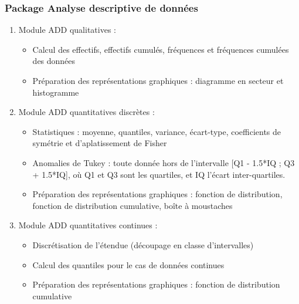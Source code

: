 			\subsubsection*{Package Analyse descriptive de données}
			\begin{enumerate}
				\item Module ADD qualitatives :
					\begin{itemize}[leftmargin=*]
					\item Calcul des effectifs, effectifs cumulés, fréquences et fréquences cumulées des données
					\item Préparation des représentations graphiques : diagramme en secteur et histogramme
					\end{itemize}
				\item Module ADD quantitatives discrètes :
					\begin{itemize}[leftmargin=*]
					\item Statistiques : moyenne, quantiles, variance, écart-type, coefficients de symétrie et d'aplatissement de Fisher
					\item Anomalies de Tukey : toute donnée hors de l'intervalle [Q1 - 1.5*IQ ; Q3 + 1.5*IQ], où Q1 et Q3 sont les quartiles, et IQ l'écart inter-quartiles.
					\item Préparation des représentations graphiques : fonction de distribution, fonction de distribution cumulative,  boîte à moustaches
					\end{itemize}
				\item Module ADD quantitatives continues :
					\begin{itemize}[leftmargin=*]
					\item Discrétisation de l'étendue (découpage en classe d'intervalles)
					\item Calcul des quantiles pour le cas  de données continues
					\item Préparation des représentations graphiques : fonction de distribution cumulative
					\end{itemize}
			\end{enumerate}
			
